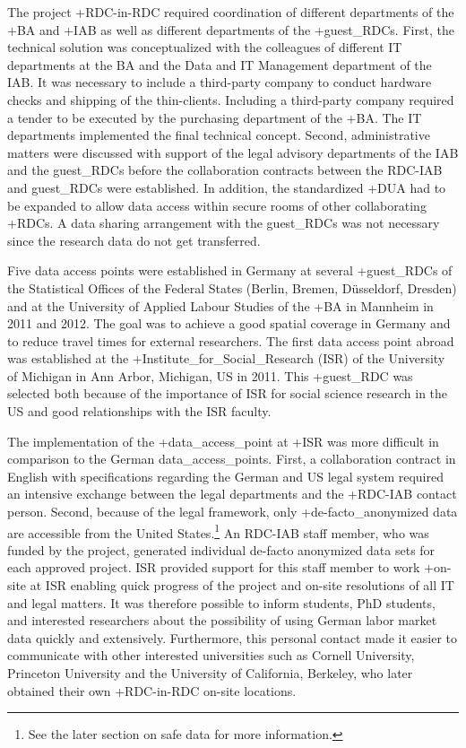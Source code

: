 \documentclass[
]{WileySix}
\begin{document}
The project +RDC-in-RDC\textbar{} required coordination of different departments of the +BA\textbar{} and +IAB\textbar{} as well as different departments of the +guest\_RDC\textbar s. First, the technical solution was conceptualized with the colleagues of different IT departments at the BA and the Data and IT Management department of the IAB. It was necessary to include a third-party company to conduct hardware checks and shipping of the thin-clients. Including a third-party company required a tender to be executed by the purchasing department of the +BA\textbar. The IT departments implemented the final technical concept. Second, administrative matters were discussed with support of the legal advisory departments of the IAB and the guest\_RDCs before the collaboration contracts between the RDC-IAB and guest\_RDCs were established. In addition, the standardized +DUA\textbar{} had to be expanded to allow data access within secure rooms of other collaborating +RDC\textbar s. A data sharing arrangement with the guest\_RDCs was not necessary since the research data do not get transferred.

Five data access points were established in Germany at several +guest\_RDC\textbar s of the Statistical Offices of the Federal States (Berlin, Bremen, Düsseldorf, Dresden) and at the University of Applied Labour Studies of the +BA\textbar{} in Mannheim in 2011 and 2012. The goal was to achieve a good spatial coverage in Germany and to reduce travel times for external researchers. The first data access point abroad was established at the +Institute\_for\_Social\_Research\textbar{} (ISR) of the University of Michigan in Ann Arbor, Michigan, US in 2011. This +guest\_RDC\textbar{} was selected both because of the importance of ISR for social science research in the US and good relationships with the ISR faculty.

The implementation of the +data\_access\_point\textbar{} at +ISR\textbar{} was more difficult in comparison to the German data\_access\_points. First, a collaboration contract in English with specifications regarding the German and US legal system required an intensive exchange between the legal departments and the +RDC-IAB\textbar{} contact person. Second, because of the legal framework, only +de-facto\_anonymized\textbar{} data are accessible from the United States.\footnote{See the later section on safe data for more information.} An RDC-IAB staff member, who was funded by the project, generated individual de-facto anonymized data sets for each approved project. ISR provided support for this staff member to work +on-site\textbar{} at ISR enabling quick progress of the project and on-site resolutions of all IT and legal matters. It was therefore possible to inform students, PhD students, and interested researchers about the possibility of using German labor market data quickly and extensively. Furthermore, this personal contact made it easier to communicate with other interested universities such as Cornell University, Princeton University and the University of California, Berkeley, who later obtained their own +RDC-in-RDC\textbar{} on-site locations.
\end{document}
